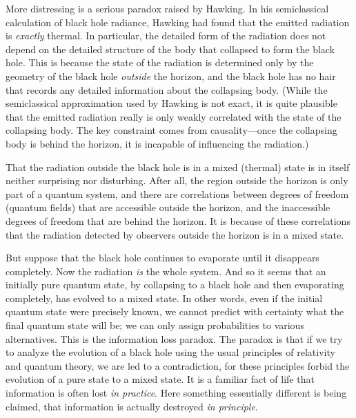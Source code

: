 More distressing is a serious paradox raised by Hawking\hawkA.  In his
semiclassical
calculation of black hole radiance, Hawking had found that the emitted
radiation is {\it exactly} thermal.  In particular, the detailed form of the
radiation does not depend on the detailed structure of the body that collapsed
to form the black hole.  This is because the state of the radiation is
determined only by the geometry of the black hole {\it outside} the horizon,
and the black hole has no hair that records any detailed information about the
collapsing body.  (While the semiclassical approximation used by Hawking is not
exact, it is quite plausible that the emitted radiation really is only weakly
correlated with the state of the collapsing body.  The key constraint comes
from causality---once the collapsing body is behind the horizon, it is
incapable of influencing the radiation.\lref{})

That the radiation outside the black hole is in a mixed (thermal) state is in
itself neither surprising nor disturbing.  After all, the region outside the
horizon is only part of a quantum system, and there are correlations between
degrees of freedom (quantum fields) that are accessible outside the horizon,
and
the inaccessible degrees of freedom that are behind the horizon.  It is because
of these correlations that the radiation detected by observers outside the
horizon is in a mixed state.

But suppose that the black hole continues to evaporate until it disappears
completely.  Now the radiation {\it is} the whole system.  And so it seems that
 an initially pure quantum state, by collapsing to a black hole and then
evaporating completely, has evolved to a mixed state.  In other words, even if
the initial quantum state were precisely known, we cannot predict with
certainty what the final quantum state will be; we can only assign
probabilities to various alternatives.  This is the information loss paradox.
The paradox is that if we try to analyze the evolution of a black hole using
the usual principles of relativity and quantum theory, we are led to a
contradiction, for these principles forbid the evolution of a pure state to a
mixed state.
It is a familiar fact of life that information is often lost {\it in
practice}.\lref{}
Here something essentially different is being claimed, that information is
actually destroyed {\it in principle}.

